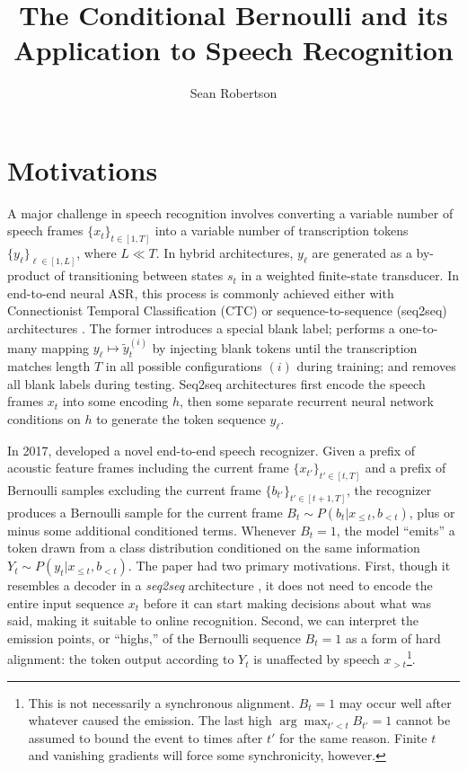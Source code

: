 \documentclass{article}
\title{The Conditional Bernoulli and its Application to Speech Recognition}
\author{Sean Robertson}
\begin{document}
\maketitle

\section{Motivations} \label{sec:motivations}

A major challenge in speech recognition involves converting a variable number
of speech frames $\{x_t\}_{t \in [1, T]}$ into a variable number of
transcription tokens $\{y_\ell\}_{\ell \in [1, L]}$, where $L \ll T$. In hybrid
architectures, $y_\ell$ are generated as a by-product of transitioning between
states $s_t$ in a weighted finite-state transducer. In end-to-end neural ASR,
this process is commonly achieved either with Connectionist Temporal
Classification (CTC) \cite{gravesConnectionistTemporalClassification2006} or
sequence-to-sequence (seq2seq) architectures
\cite{bahdanauNeuralMachineTranslation2015}. The former introduces a special
blank label; performs a one-to-many mapping $y_\ell \mapsto \tilde{y}_t^{(i)}$
by injecting blank tokens until the transcription matches length $T$ in all
possible configurations $(i)$ during training; and removes all blank labels
during testing. Seq2seq architectures first encode the speech frames $x_t$ into
some encoding $h$, then some separate recurrent neural network conditions on
$h$ to generate the token sequence $y_\ell$.

In 2017, \citeauthor{luoLearningOnlineAlignments2017} developed a novel
end-to-end speech recognizer. Given a prefix of acoustic feature frames
including the current frame $\{x_{t'}\}_{t' \in [t, T]}$ and a prefix of
Bernoulli samples excluding the current frame $\{b_{t'}\}_{t' \in [t+1,T]}$,
the recognizer produces a Bernoulli sample for the current frame $B_t \sim
    P(b_t|x_{\leq t}, b_{<t})$, plus or minus some additional conditioned terms.
Whenever $B_t = 1$, the model ``emits'' a token drawn from a class distribution
conditioned on the same information $Y_t \sim P(y_t|x_{\leq t}, b_{<t})$. The
paper had two primary motivations. First, though it resembles a decoder in a
\textit{seq2seq} architecture \cite{bahdanauNeuralMachineTranslation2015}, it
does not need to encode the entire input sequence $x_t$ before it can start
making decisions about what was said, making it suitable to online recognition.
Second, we can interpret the emission points, or ``highs,'' of the Bernoulli
sequence $B_t = 1$ as a form of hard alignment: the token output according to
$Y_t$ is unaffected by speech $x_{>t}$\footnote{
    This is not necessarily a synchronous alignment. $B_t = 1$ may occur well
    after whatever caused the emission. The last high $\arg\max_{t' < t} B_{t'}
        = 1$ cannot be assumed to bound the event to times after $t'$ for the same
    reason. Finite $t$ and vanishing gradients will force some synchronicity,
    however.
}.
\end{document}
